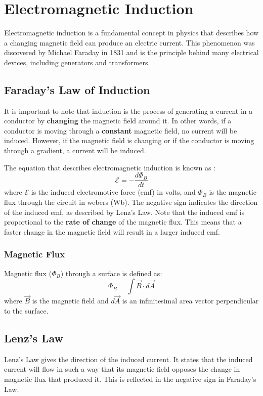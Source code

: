 \chapter{Electromagnetic Induction}

Electromagnetic induction is a fundamental concept in physics that describes how a changing magnetic field can produce an electric current. This phenomenon was discovered by Michael Faraday in 1831 and is the principle behind many electrical devices, including generators and transformers.

\section{Faraday's Law of Induction}
It is important to note that induction is the process of generating a current in a conductor by \textbf{changing} the magnetic field around it. In other words, if a conductor is moving through a \textbf{constant} magnetic field, no current will be induced. However, if the magnetic field is changing or if the conductor is moving through a gradient, a current will be induced.

The equation that describes electromagnetic induction is known as :
\[
\mathcal{E} = -\frac{d\Phi_B}{dt}
\]
where $\mathcal{E}$ is the induced electromotive force (emf) in volts, and $\Phi_B$ is the magnetic 
flux through the circuit in webers (Wb). The negative sign indicates the direction of the induced emf, as described by Lenz's Law.
Note that the induced emf is proportional to the \textbf{rate of change} of the magnetic flux. This means that a faster change in the magnetic 
field will result in a larger induced emf.

\subsection{Magnetic Flux}
Magnetic flux ($\Phi_B$) through a surface is defined as:
\[
\Phi_B = \int \vec{B} \cdot d\vec{A}
\]  
where $\vec{B}$ is the magnetic field and $d\vec{A}$ is an infinitesimal area vector perpendicular to the surface.

\section{Lenz's Law}
Lenz's Law gives the direction of the induced current. It states that the induced current will flow in such a way that its magnetic field opposes the change in magnetic flux that produced it. This is reflected in the negative sign in Faraday's Law.

